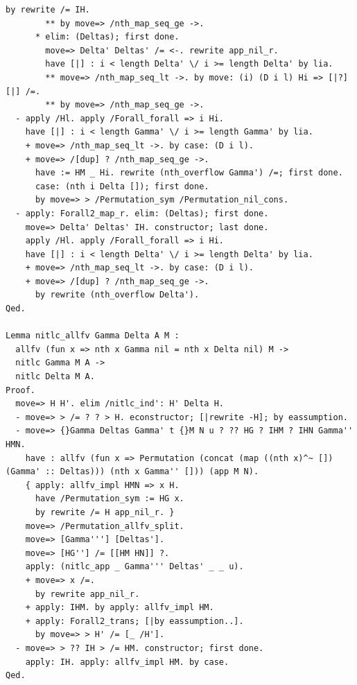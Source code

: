 \begin{lstlisting}[style=authorcoq]
           by rewrite /= IH.
        ** by move=> /nth_map_seq_ge ->.
      * elim: (Deltas); first done.
        move=> Delta' Deltas' /= <-. rewrite app_nil_r.
        have [|] : i < length Delta' \/ i >= length Delta' by lia.
        ** move=> /nth_map_seq_lt ->. by move: (i) (D i l) Hi => [|?] [|] /=.
        ** by move=> /nth_map_seq_ge ->.
  - apply /Hl. apply /Forall_forall => i Hi.
    have [|] : i < length Gamma' \/ i >= length Gamma' by lia.
    + move=> /nth_map_seq_lt ->. by case: (D i l).
    + move=> /[dup] ? /nth_map_seq_ge ->.
      have := HM _ Hi. rewrite (nth_overflow Gamma') /=; first done.
      case: (nth i Delta []); first done.
      by move=> > /Permutation_sym /Permutation_nil_cons.
  - apply: Forall2_map_r. elim: (Deltas); first done.
    move=> Delta' Deltas' IH. constructor; last done.
    apply /Hl. apply /Forall_forall => i Hi.
    have [|] : i < length Delta' \/ i >= length Delta' by lia.
    + move=> /nth_map_seq_lt ->. by case: (D i l).
    + move=> /[dup] ? /nth_map_seq_ge ->.
      by rewrite (nth_overflow Delta').
Qed.

Lemma nitlc_allfv Gamma Delta A M :
  allfv (fun x => nth x Gamma nil = nth x Delta nil) M ->
  nitlc Gamma M A ->
  nitlc Delta M A.
Proof.
  move=> H H'. elim /nitlc_ind': H' Delta H.
  - move=> > /= ? ? > H. econstructor; [|rewrite -H]; by eassumption.
  - move=> {}Gamma Deltas Gamma' t {}M N u ? ?? HG ? IHM ? IHN Gamma'' HMN.
    have : allfv (fun x => Permutation (concat (map ((nth x)^~ []) (Gamma' :: Deltas))) (nth x Gamma'' [])) (app M N).
    { apply: allfv_impl HMN => x H.
      have /Permutation_sym := HG x.
      by rewrite /= H app_nil_r. }
    move=> /Permutation_allfv_split.
    move=> [Gamma'''] [Deltas'].
    move=> [HG''] /= [[HM HN]] ?.
    apply: (nitlc_app _ Gamma''' Deltas' _ _ u).
    + move=> x /=.
      by rewrite app_nil_r.
    + apply: IHM. by apply: allfv_impl HM.
    + apply: Forall2_trans; [|by eassumption..].
      by move=> > H' /= [_ /H'].
  - move=> > ?? IH > /= HM. constructor; first done.
    apply: IH. apply: allfv_impl HM. by case.
Qed.


\end{lstlisting}
